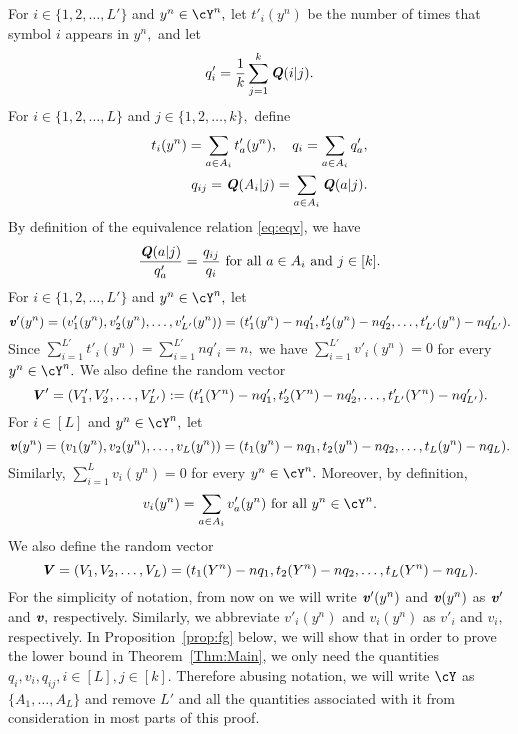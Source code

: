 \documentclass[11pt,onecolumn]{IEEEtran}
\def\mathbi#1{{\textbf{\textit #1}}}
\begin{document}
For $i\in\{1,2,\dots,L'\}$ and $y^n\in\cY^n,$ let $t'_i(y^n)$ be the number of times that symbol $i$ appears in $y^n,$
and let 
\begin{equation}\label{eq:qpr}
q'_i=\frac{1}{k}\sum_{j=1}^k \mathbi{Q}(i|j).
\end{equation}
For $i\in\{1,2,\dots,L\}$ and $j\in\{1,2,\dots,k\},$ define 
   \begin{equation}\label{eq:tq}
   \begin{aligned}
   t_i(y^n)=\sum_{a\in A_i}t'_a(y^n),\quad  q_i=\sum_{a\in A_i} q'_a,\\
   q_{ij}= \mathbi{Q}(A_i|j) = \sum_{a\in A_i}\mathbi{Q}(a|j).
   \end{aligned}
\end{equation}
By definition of the equivalence relation \eqref{eq:eqv}, we have
   \begin{equation}\label{eq:eqclass}
\frac{\mathbi{Q}(a|j)}{q'_a}=\frac{q_{ij}}{q_i} \text{~for all~} a\in A_i \text{~and~} j\in[k].
\end{equation}
For $i\in\{1,2,\dots,L'\}$ and $y^n\in\cY^n,$ let 
$$
\mathbi{v}'(y^n)=(v'_1(y^n),v'_2(y^n),\dots,v'_{L'}(y^n))=(t'_1(y^n) - n q'_1, t'_2(y^n) - n q'_2,\dots, t'_{L'}(y^n) - n q'_{L'}).
$$
Since $\sum_{i=1}^{L'} t'_i(y^n) = \sum_{i=1}^{L'} n q'_i = n,$ we have $\sum_{i=1}^{L'} v'_i(y^n)=0$ for every $y^n\in\cY^n.$
We also define the random vector
$$
\mathbi{V}'=(V'_1,V'_2,\dots,V'_{L'}):=(t'_1(Y^n) - n q'_1, t'_2(Y^n) - n q'_2,\dots, t'_{L'}(Y^n) - n q'_{L'}).$$
For $i\in[L]$ and $y^n\in\cY^n,$ let 
$$
\mathbi{v}(y^n)=(v_1(y^n),v_2(y^n),\dots,v_L(y^n))=(t_1(y^n) - n q_1, t_2(y^n) - n q_2,\dots, t_L(y^n) - n q_L).
$$
Similarly, $\sum_{i=1}^L v_i(y^n)=0$ for every $y^n\in\cY^n.$ Moreover, by definition,
\begin{equation}\label{eq:vi}
v_i(y^n)=\sum_{a\in A_i} v'_a(y^n) \text{~for all~} y^n\in\cY^n.
\end{equation}
We also define the random vector
$$
\mathbi{V}=(V_1,V_2,\dots,V_L)=(t_1(Y^n) - n q_1, t_2(Y^n) - n q_2,\dots, t_L(Y^n) - n q_L).
$$ 
For the simplicity of notation, from now on we will write $\mathbi{v}'(y^n)$ and $\mathbi{v}(y^n)$ as $\mathbi{v}'$ and $\mathbi{v},$ respectively. Similarly, we abbreviate $v'_i(y^n)$ and $v_i(y^n)$ as $v'_i$ and $v_i,$ respectively.
In Proposition~\ref{prop:fg} below, we will show that in order to prove the lower bound in Theorem~\ref{Thm:Main}, we only need the quantities $q_i,v_i,q_{ij},i\in[L],j\in[k]$. Therefore abusing notation, we will write $\cY$ as $\{A_1,\dots,A_L\}$ and remove $L'$ and all the quantities associated with it from consideration in most parts of this proof.
\end{document}
